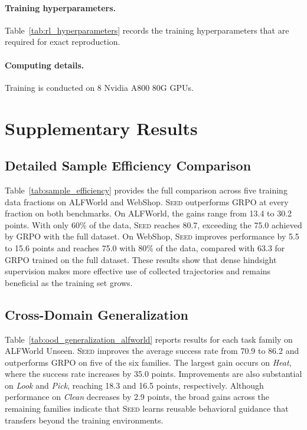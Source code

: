 \paragraph{Training hyperparameters.}
Table~\ref{tab:rl_hyperparameters} records the training hyperparameters that are required for exact reproduction.



\paragraph{Computing details.}
Training is conducted on 8 Nvidia A800 80G GPUs.


\section{Supplementary Results}\label{app:supp_results}

\subsection{Detailed Sample Efficiency Comparison}
\label{app:sample_efficiency}
Table~\ref{tab:sample_efficiency} provides the full comparison across five training data fractions on ALFWorld and WebShop. \textsc{Seed} outperforms GRPO at every fraction on both benchmarks. On ALFWorld, the gains range from 13.4 to 30.2 points. With only 60\% of the data, \textsc{Seed} reaches 80.7, exceeding the 75.0 achieved by GRPO with the full dataset. On WebShop, \textsc{Seed} improves performance by 5.5 to 15.6 points and reaches 75.0 with 80\% of the data, compared with 63.3 for GRPO trained on the full dataset. These results show that dense hindsight supervision makes more effective use of collected trajectories and remains beneficial as the training set grows.





\subsection{Cross-Domain Generalization}
\label{app:ood_generalization}
Table~\ref{tab:ood_generalization_alfworld} reports results for each task family on ALFWorld Unseen. \textsc{Seed} improves the average success rate from 70.9 to 86.2 and outperforms GRPO on five of the six families. The largest gain occurs on \textit{Heat}, where the success rate increases by 35.0 points. Improvements are also substantial on \textit{Look} and \textit{Pick}, reaching 18.3 and 16.5 points, respectively. Although performance on \textit{Clean} decreases by 2.9 points, the broad gains across the remaining families indicate that \textsc{Seed} learns reusable behavioral guidance that transfers beyond the training environments.

